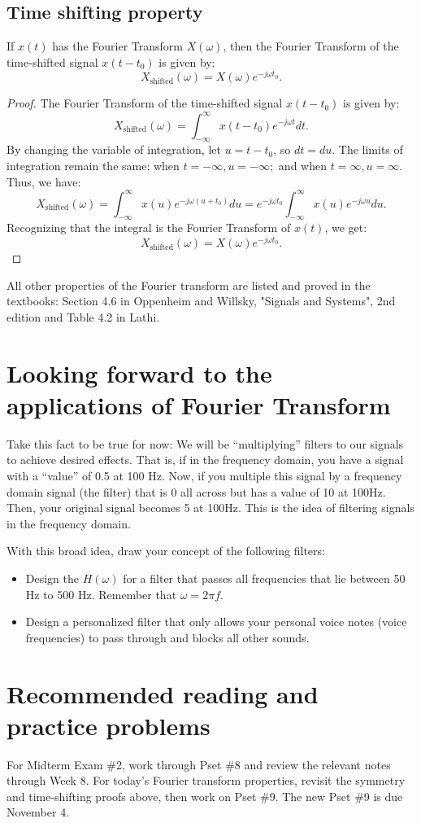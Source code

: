\subsection{Time shifting property}
\label{sec:w9l1-time-shifting}
If $x(t)$ has the Fourier Transform $X(\omega)$, then the Fourier Transform of the time-shifted signal $x(t - t_0)$ is given by:
\[
X_{\text{shifted}}(\omega) = X(\omega) e^{-j \omega t_0}.
\]
\begin{proof}
The Fourier Transform of the time-shifted signal $x(t - t_0)$ is given by:
\[
X_{\text{shifted}}(\omega) = \int_{-\infty}^{\infty} x(t - t_0) e^{-j \omega t} dt.
\]
By changing the variable of integration, let $u = t - t_0$, so $dt = du$. The limits of integration remain the same: when $t = -\infty, u = -\infty;$ and when $t = \infty, u = \infty$. Thus, we have:
\[
X_{\text{shifted}}(\omega) = \int_{-\infty}^{\infty} x(u) e^{-j \omega (u + t_0)} du = e^{-j \omega t_0} \int_{-\infty}^{\infty} x(u) e^{-j \omega u} du.
\]
Recognizing that the integral is the Fourier Transform of $x(t)$, we get:
\[
X_{\text{shifted}}(\omega) = X(\omega) e^{-j \omega t_0}.
\]
\end{proof}
All other properties of the Fourier transform are listed and proved in the textbooks: Section 4.6 in Oppenheim and Willsky, "Signals and Systems", 2nd edition and Table 4.2 in Lathi. 
\section{Looking forward to the applications of Fourier Transform}
\label{sec:w9l1-filtering-preview}
Take this fact to be true for now: We will be ``multiplying'' filters to our signals to achieve desired effects. That is, if in the frequency domain, you have a signal with a ``value'' of 0.5 at 100 Hz. Now, if you multiple this signal by a frequency domain signal (the filter) that is 0 all across but has a value of 10 at 100Hz. Then, your original signal becomes 5 at 100Hz. This is the idea of filtering signals in the frequency domain.

With this broad idea, draw your concept of the following filters:

\begin{itemize}
    \item Design the $H(\omega)$ for a filter that passes all frequencies that lie between 50 Hz to 500 Hz. Remember that $\omega = 2 \pi f$.
    \item Design a personalized filter that only allows your personal voice notes (voice frequencies) to pass through and blocks all other sounds.
\end{itemize}
\section{Recommended reading and practice problems}
For Midterm Exam \#2, work through Pset \#8 and review the relevant notes through Week 8. For today's Fourier transform properties, revisit the symmetry and time-shifting proofs above, then work on Pset \#9. The new Pset \#9 is due November 4.
